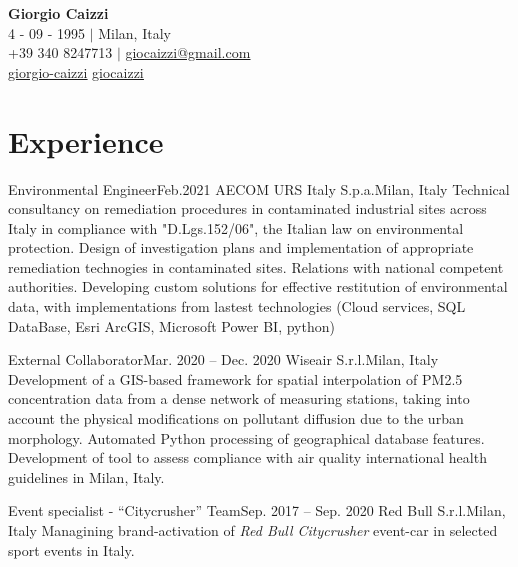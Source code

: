 \documentclass[letterpaper,11pt]{article}
\begin{document}
\begin{center}
  \textbf{\Huge \bfseries Giorgio Caizzi} \\
  \vspace{2pt} 4 - 09 - 1995 $|$ Milan, Italy \\
  \small +39 340 8247713 $|$ \href{mailto:x@x.com}{\underline{giocaizzi@gmail.com}}\\
  \faLinkedinSquare{ : }\href{https://linkedin.com/in/giorgio-caizzi/}{\underline{giorgio-caizzi}}
  \faGithubSquare{ : }\href{https://www.github.com/giocaizzi/}{\underline{giocaizzi}}\\
\end{center}

\section{Experience}
\sectionElementListStart

\sectionElement
{Environmental Engineer}{Feb.2021}
{AECOM URS Italy S.p.a.}{Milan, Italy}
{
  Technical consultancy on remediation procedures in contaminated industrial sites across Italy
  in compliance with "D.Lgs.152/06", the Italian law on environmental protection.
}
\sectionElementSubListStart
\sectionElementSubListItem
{Design of investigation plans and implementation of appropriate
  remediation technogies in contaminated sites.}
\sectionElementSubListItem
{Relations with national competent authorities.}
\sectionElementSubListItem
{Developing custom solutions for effective restitution of environmental data,
  with implementations from lastest technologies (Cloud services, SQL DataBase,
  Esri ArcGIS, Microsoft Power BI, python)}
\sectionElementSubListEnd

\sectionElement
{External Collaborator}{Mar. 2020 -- Dec. 2020}
{Wiseair S.r.l.}{Milan, Italy}
{
  Development of a GIS-based framework for spatial interpolation of PM2.5 concentration
  data from a dense network of measuring stations, taking into account the physical
  modifications on pollutant diffusion due to the urban morphology.
}
\sectionElementSubListStart
\sectionElementSubListItem
{Automated Python processing of geographical database features.}
\sectionElementSubListItem
{Development of tool to assess compliance with air quality international health guidelines
  in Milan, Italy.}
\sectionElementSubListEnd

\sectionElement
{Event specialist - “Citycrusher” Team}{Sep. 2017 -- Sep. 2020}
{Red Bull S.r.l.}{Milan, Italy}
{Managining brand-activation of \textit{Red Bull Citycrusher} event-car in selected sport
  events in Italy.}
\end{document}

